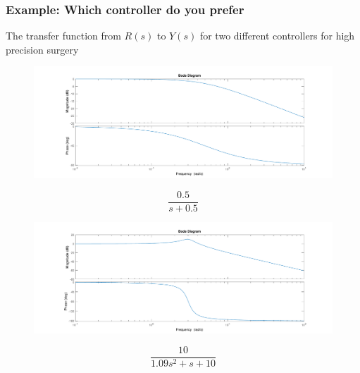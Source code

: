 \begin{frame}
	\frametitle{Example: Which controller do you prefer}
	The transfer function from $R(s)$ to $Y(s)$ for two different controllers for high precision surgery\\
	\begin{minipage}{0.7\linewidth}
	\begin{figure}
\centering
\includegraphics[width=\columnwidth]{smooth-bode}
\label{fig:smooth-bode}
\end{figure}
\end{minipage}
\hfill
\begin{minipage}{0.2\linewidth}
	\[\frac{0.5}{s+0.5}\]
\end{minipage}
\vspace*{-3em}
\begin{minipage}{0.7\linewidth}
\begin{figure}
\centering
\includegraphics[width=\columnwidth]{osc-bode}
\label{fig:osc-bode}
\end{figure}
\end{minipage}
\hfill
\begin{minipage}{0.2\linewidth}
	\[\frac{10}{1.09s^2 + s + 10}\]
\end{minipage}
\end{frame}



